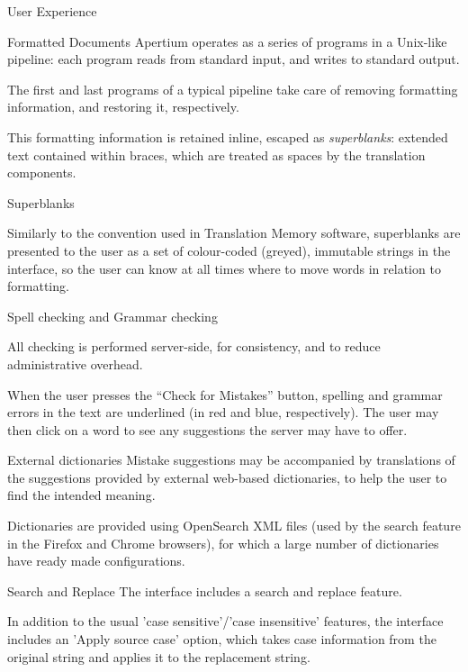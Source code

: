\documentclass{beamer}
\begin{document}
\begin{section}{User Experience}
\begin{frame}{Formatted Documents}
Apertium operates as a series of programs in a Unix-like pipeline:
each program reads from standard input, and writes to standard output.

The first and last programs of a typical pipeline take care of removing
formatting information, and restoring it, respectively.

This formatting information is retained inline, escaped as
{\it superblanks}: extended text contained within braces,
which are treated as spaces by the translation components.
\end{frame}

\begin{frame}{Superblanks}

Similarly to the convention used in Translation Memory software,
superblanks are presented to the user as a set of colour-coded
(greyed), immutable strings in the interface, so the user can
know at all times where to move words in relation to formatting.
\end{frame}
\begin{frame}{Spell checking and Grammar checking}

All checking is performed server-side, for consistency, and to reduce 
administrative overhead.

When the user presses the ``Check for Mistakes'' button, spelling and 
grammar errors in the text are underlined (in red and blue, respectively).
The user may then click on a word to see any suggestions the server
may have to offer.

\end{frame}

\begin{frame}{External dictionaries}
Mistake suggestions may be accompanied by translations of the suggestions
provided by external web-based dictionaries, to help the user to find
the intended meaning.

Dictionaries are provided using OpenSearch XML files (used by the search
feature in the Firefox and Chrome browsers), for which a large number
of dictionaries have ready made configurations.
\end{frame}

\begin{frame}{Search and Replace}
The interface includes a search and replace feature.

In addition to the usual 'case sensitive'/'case insensitive' features,
the interface includes an 'Apply source case' option, which takes
case information from the original string and applies it to the
replacement string.
\end{frame}
\end{section}
\end{document}
